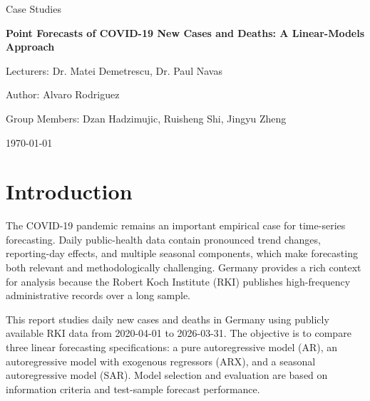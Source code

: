 ﻿\documentclass[12pt,a4paper]{article}
\begin{document}
\begin{titlepage}
    \centering
    \vspace*{2cm}

    {\Large Case Studies \par}
    \vspace{1.5cm}

    {\Huge \textbf{Point Forecasts of COVID-19 New Cases and Deaths: A Linear-Models Approach} \par}
    \vspace{1.5cm}

    {\large Lecturers: Dr. Matei Demetrescu, Dr. Paul Navas \par}
    \vspace{1cm}

    {\large Author: Alvaro Rodriguez \par}
    {\large Group Members: Dzan Hadzimujic, Ruisheng Shi, Jingyu Zheng \par}
    \vfill

    {\large \today \par}
\end{titlepage}

\tableofcontents
\newpage


\section{Introduction}

The COVID-19 pandemic remains an important empirical case for time-series forecasting. Daily public-health data contain pronounced trend changes, reporting-day effects, and multiple seasonal components, which make forecasting both relevant and methodologically challenging. Germany provides a rich context for analysis because the Robert Koch Institute (RKI) publishes high-frequency administrative records over a long sample.

This report studies daily new cases and deaths in Germany using publicly available RKI data from 2020-04-01 to 2026-03-31. The objective is to compare three linear forecasting specifications: a pure autoregressive model (AR), an autoregressive model with exogenous regressors (ARX), and a seasonal autoregressive model (SAR). Model selection and evaluation are based on information criteria and test-sample forecast performance.
\end{document}
